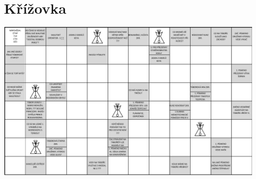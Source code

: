 \chapter{Křížovka} %
\label{cha:křížovka}

\begin{center}

\vspace{-20pt}

\includegraphics[angle=270,origin=c,height=0.7\textheight]{img/krizovka.pdf}
\end{center}
